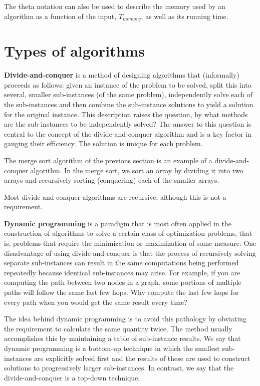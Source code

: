 \documentclass[justified,sixbynine]{tufte-book}
\theoremstyle{plain}%
\theoremstyle{definition}
\theoremstyle{remark}
\begin{document}
\begin{fullwidth}
The theta notation can also be used to describe the memory used by an algorithm as a function of the input, $T_{memory}$, as well as its running time.

\goodbreak\section{Types of algorithms}


{\bf Divide-and-conquer}
 is a method of designing algorithms that
(informally) proceeds as follows: given an instance of the problem to be
solved, split this into several, smaller sub-instances (of the same
problem), independently solve each of the sub-instances and then combine the
sub-instance solutions to yield a solution for the original instance.
This description raises the question, by what methods are the sub-instances
to be independently solved? The answer to this question is central to the
concept of the divide-and-conquer algorithm and is a key factor in gauging
their efficiency. The solution is unique for each problem.

The merge sort algorithm of the previous section is an example of a divide-and-conquer algorithm. In the merge sort, we sort an array by dividing it into two arrays and recursively sorting (conquering) each of the smaller arrays.

Most divide-and-conquer algorithms are recursive, although this is not a requirement.

{\bf Dynamic programming}
is a paradigm that is most often applied in the
construction of algorithms to solve a certain class of optimization
problems, that is, problems that require the minimization or maximization of
some measure. One disadvantage of using divide-and-conquer is that the
process of recursively solving separate sub-instances can result in the same
computations being performed repeatedly because identical sub-instances may
arise. For example, if you are computing the path between two nodes in a graph,
some portions of multiple paths will follow the same last few hops. Why compute
the last few hops for every path when you would get the same result every time?

The idea behind dynamic programming is to avoid this pathology by
obviating the requirement to calculate the same quantity twice. The method
usually accomplishes this by maintaining a table of sub-instance results. We
say that dynamic programming is a bottom-up technique in which the smallest
sub-instances are explicitly solved first and the results of these are used to
construct solutions to progressively larger sub-instances. In contrast, we
say that the divide-and-conquer is a top-down technique.



\end{fullwidth}
\end{document}
